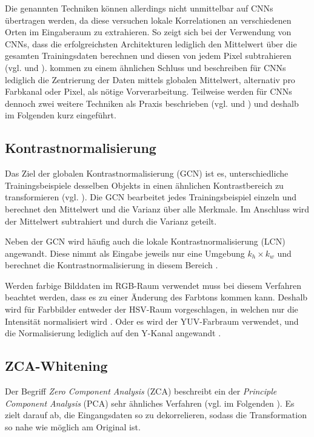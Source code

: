 Die genannten Techniken können allerdings nicht unmittelbar auf CNNs übertragen werden, da diese versuchen lokale Korrelationen an verschiedenen Orten im Eingaberaum zu extrahieren.
So zeigt sich bei der Verwendung von CNNs, dass die erfolgreichsten Architekturen lediglich den Mittelwert über die gesamten Trainingsdaten berechnen und diesen von jedem Pixel subtrahieren (vgl. \cite{Krizhevsky2012} und \cite{Simonyan2014}).
\cite{Kaparthy2014} kommen zu einem ähnlichen Schluss und beschreiben für CNNs lediglich die Zentrierung der Daten mittels globalen Mittelwert, alternativ pro Farbkanal oder Pixel, als nötige Vorverarbeitung. 
Teilweise werden für CNNs dennoch zwei weitere Techniken als Praxis beschrieben (vgl. \cite{Andrade2014} und \cite{Goodfellow_maxout_2013}) und deshalb im Folgenden kurz eingeführt.

\subsection{Kontrastnormalisierung}
Das Ziel der globalen Kontrastnormalisierung (GCN) ist es, unterschiedliche Trainingsbeispiele desselben Objekts in einen ähnlichen Kontrastbereich zu transformieren (vgl. \cite{Sermanet2012}). Die GCN bearbeitet jedes Trainingsbeispiel einzeln und berechnet den Mittelwert und die Varianz über alle Merkmale. Im Anschluss wird der Mittelwert subtrahiert und durch die Varianz geteilt. 

Neben der GCN wird häufig auch die lokale Kontrastnormalisierung (LCN) angewandt. Diese nimmt als Eingabe jeweils nur eine Umgebung $k_h \times k_w$ und berechnet die Kontrastnormalisierung in diesem Bereich \cite[vgl.][]{Sermanet2012}. 

Werden farbige Bilddaten im RGB-Raum verwendet muss bei diesem Verfahren beachtet werden, dass es zu einer Änderung des Farbtons kommen kann. Deshalb wird für Farbbilder entweder der HSV-Raum vorgeschlagen, in welchen nur die Intensität normalisiert wird \cite[vgl.][S. 56]{Pink2011}.
Oder es wird der YUV-Farbraum verwendet, und die Normalisierung lediglich auf den Y-Kanal angewandt \cite[vgl.][]{Sermanet2012}.

\subsection{ZCA-Whitening}
Der Begriff \textit{Zero Component Analysis} (ZCA) beschreibt ein der \textit{Principle Component Analysis} (PCA) sehr ähnliches Verfahren (vgl. im Folgenden \cite{Krizhevsky2009}). Es zielt darauf ab, die Eingangsdaten so zu dekorrelieren, sodass die Transformation so nahe wie möglich am Original ist. 

